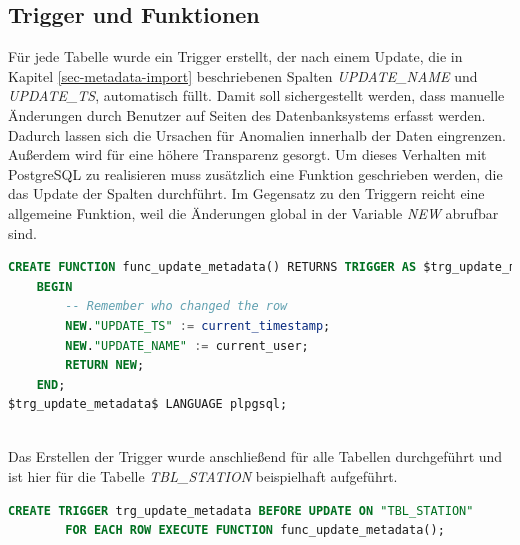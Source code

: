 \subsection{Trigger und Funktionen}
Für jede Tabelle wurde ein Trigger erstellt, der nach einem Update, die in Kapitel \ref{sec-metadata-import} beschriebenen Spalten \textit{UPDATE\_NAME} und \textit{UPDATE\_TS}, automatisch füllt. 
Damit soll sichergestellt werden, dass manuelle Änderungen durch Benutzer auf Seiten des Datenbanksystems erfasst werden. Dadurch lassen sich die Ursachen für
Anomalien innerhalb der Daten eingrenzen. Außerdem wird für eine höhere Transparenz gesorgt. Um dieses Verhalten mit PostgreSQL
zu realisieren muss zusätzlich eine Funktion geschrieben werden, die das Update der Spalten durchführt. Im Gegensatz zu den Triggern reicht eine allgemeine Funktion, weil
die Änderungen global in der Variable \textit{NEW} abrufbar sind.
~\\
\begin{lstlisting}[language={SQL}, caption={Funktion für die Aktualisierung der Metadaten}, captionpos=b, label={list-function}]
CREATE FUNCTION func_update_metadata() RETURNS TRIGGER AS $trg_update_metadata$
    BEGIN
        -- Remember who changed the row
        NEW."UPDATE_TS" := current_timestamp;
        NEW."UPDATE_NAME" := current_user;
        RETURN NEW;
    END;
$trg_update_metadata$ LANGUAGE plpgsql;
\end{lstlisting}~\\
Das Erstellen der Trigger wurde anschließend für alle Tabellen durchgeführt und ist hier für die Tabelle \textit{TBL\_STATION} beispielhaft aufgeführt.
~\\
\begin{lstlisting}[language={SQL}, caption={Trigger für die Tabelle TBL\_STATION}, captionpos=b, label={list-trigger}]
    CREATE TRIGGER trg_update_metadata BEFORE UPDATE ON "TBL_STATION"
        FOR EACH ROW EXECUTE FUNCTION func_update_metadata();
\end{lstlisting}
